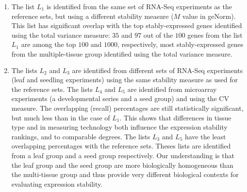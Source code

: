 \documentclass[11pt, a4paper]{article}
\begin{document}
\begin{enumerate}
    \item
	The list $L_1$ is identified from the same set of RNA-Seq experiments as the
	reference sets, but using a different stability measure ($M$ value in
	geNorm). This list has significant overlap with the top
	stably-expressed genes identified using the total variance measure:
	$35$ and $97$ out of the $100$ genes from the list $L_1$ are among the
	top $100$ and $1000$, respectively, most stably-expressed genes from the
	multiple-tissue group identified using the total variance measure. 
    \item
	The lists $L_2$ and $L_3$ are identified from different sets of
	RNA-Seq experiments (leaf and seedling experiments) using the same
	stability measure as used for the reference sets. The lists $L_4$ and $L_5$ are
	identified from microarray experiments (a developmental series and a
	seed group) and using the CV measure. The overlapping (recall)
	percentages are still statistically significant, but much less than in
	the case of $L_1$.  This shows that differences in tissue type and in
	measuring technology both influence the expression stability rankings,
	and to comparable degrees. The lists $L_3$ and $L_5$ have the least
	overlapping percentages with the reference sets. Theses lists are
	identified from a leaf group and a seed group respectively.
	Our understanding is that the leaf group and the seed group are more
	biologically homogeneous than the multi-tissue group and thus provide
	very different biological contexts for evaluating expression stability.
\end{enumerate}


\end{document}

